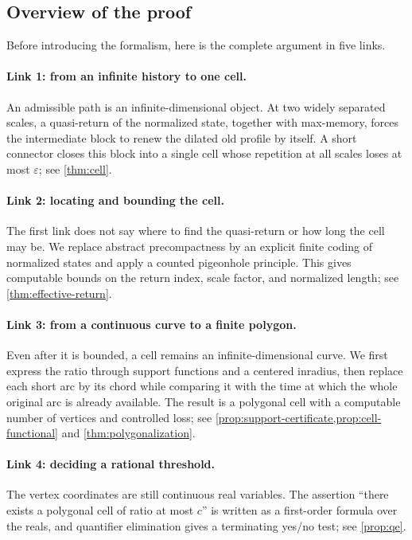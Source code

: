 \documentclass[10pt,a4paper]{article}
\theoremstyle{definition}
\theoremstyle{remark}
\newcommand{\eps}{\varepsilon}
\begin{document}
\subsection{Overview of the proof}
Before introducing the formalism, here is the complete argument in five links.

\paragraph{Link 1: from an infinite history to one cell.}
An admissible path is an infinite-dimensional object. At two widely separated scales, a quasi-return of the normalized state, together with max-memory, forces the intermediate block to renew the dilated old profile by itself. A short connector closes this block into a single cell whose repetition at all scales loses at most $\eps$; see \cref{thm:cell}.

\paragraph{Link 2: locating and bounding the cell.}
The first link does not say where to find the quasi-return or how long the cell may be. We replace abstract precompactness by an explicit finite coding of normalized states and apply a counted pigeonhole principle. This gives computable bounds on the return index, scale factor, and normalized length; see \cref{thm:effective-return}.

\paragraph{Link 3: from a continuous curve to a finite polygon.}
Even after it is bounded, a cell remains an infinite-dimensional curve. We first express the ratio through support functions and a centered inradius, then replace each short arc by its chord while comparing it with the time at which the whole original arc is already available. The result is a polygonal cell with a computable number of vertices and controlled loss; see \cref{prop:support-certificate,prop:cell-functional} and \cref{thm:polygonalization}.

\paragraph{Link 4: deciding a rational threshold.}
The vertex coordinates are still continuous real variables. The assertion ``there exists a polygonal cell of ratio at most $c$'' is written as a first-order formula over the reals, and quantifier elimination gives a terminating yes/no test; see \cref{prop:qe}.
\end{document}
